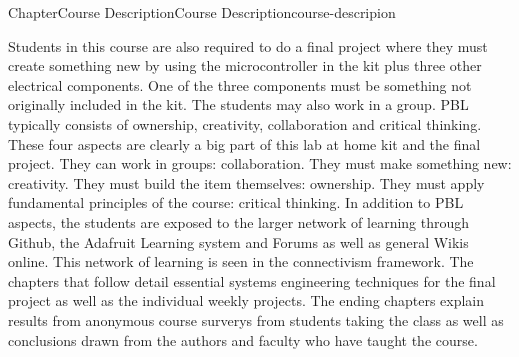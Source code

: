 \documentclass[oneside,10pt,]{book}
\numberwithin{equation}{section}
\begin{document}
\begin{chapterptx}{Chapter}{Course Description}{}{Course Description}{}{}{course-descripion}
\begin{introduction}{}
Students in this course are also required to do a final project where they must create something new by using the microcontroller in the kit plus three other electrical components. One of the three components must be something not originally included in the kit. The students may also work in a group. PBL typically consists of ownership, creativity, collaboration and critical thinking. These four aspects are clearly a big part of this lab at home kit and the final project. They can work in groups: collaboration. They must make something new: creativity. They must build the item themselves: ownership. They must apply fundamental principles of the course: critical thinking. In addition to PBL aspects, the students are exposed to the larger network of learning through Github, the Adafruit Learning system and Forums as well as general Wikis online. This network of learning is seen in the connectivism framework. The chapters that follow detail essential systems engineering techniques for the final project as well as the individual weekly projects. The ending chapters explain results from anonymous course surverys from students taking the class as well as conclusions drawn from the authors and faculty who have taught the course.%
\end{introduction}%
\end{chapterptx}
%
%
\typeout{************************************************}
\typeout{************************************************}
%
\end{document}
